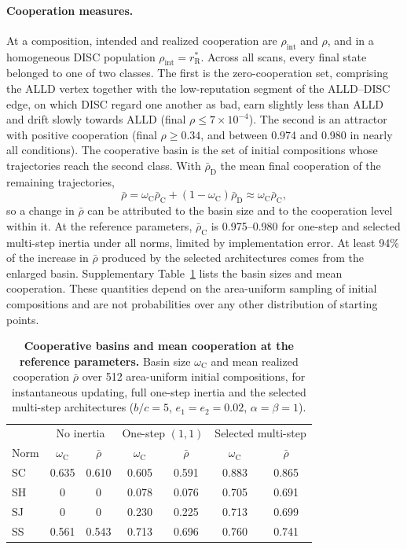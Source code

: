 \documentclass[fleqn,10pt]{wlscirep}
\newcommand{\rR}{r_{\mathrm{R}}^{*}}
\theoremstyle{plain}
\begin{document}
\paragraph{Cooperation measures.} At a composition, intended and realized cooperation are $\rho_{\mathrm{int}}$ and $\rho$, and in a homogeneous DISC population $\rho_{\mathrm{int}}=\rR$. Across all scans, every final state belonged to one of two classes. The first is the zero-cooperation set, comprising the ALLD vertex together with the low-reputation segment of the ALLD--DISC edge, on which DISC regard one another as bad, earn slightly less than ALLD and drift slowly towards ALLD (final $\rho\leq7\times10^{-4}$). The second is an attractor with positive cooperation (final $\rho\geq0.34$, and between 0.974 and 0.980 in nearly all conditions). The cooperative basin is the set of initial compositions whose trajectories reach the second class. With $\bar\rho_{\mathrm D}$ the mean final cooperation of the remaining trajectories,
\begin{equation}
\bar\rho=\omega_{\mathrm C}\bar\rho_{\mathrm C}+(1-\omega_{\mathrm C})\bar\rho_{\mathrm D}\approx\omega_{\mathrm C}\bar\rho_{\mathrm C},
\label{eq:s-decomposition}
\end{equation}
so a change in $\bar\rho$ can be attributed to the basin size and to the cooperation level within it. At the reference parameters, $\bar\rho_{\mathrm C}$ is 0.975--0.980 for one-step and selected multi-step inertia under all norms, limited by implementation error. At least 94\% of the increase in $\bar\rho$ produced by the selected architectures comes from the enlarged basin. Supplementary Table~\ref{tab:si-basins} lists the basin sizes and mean cooperation. These quantities depend on the area-uniform sampling of initial compositions and are not probabilities over any other distribution of starting points.

\begin{table}[!htbp]
\centering
\caption{\textbf{Cooperative basins and mean cooperation at the reference parameters.} Basin size $\omega_{\mathrm C}$ and mean realized cooperation $\bar\rho$ over 512 area-uniform initial compositions, for instantaneous updating, full one-step inertia and the selected multi-step architectures ($b/c=5$, $e_1=e_2=0.02$, $\alpha=\beta=1$).}
\label{tab:si-basins}
\small
\begin{tabular}{@{}lcccccc@{}}
\toprule
 & \multicolumn{2}{c}{No inertia} & \multicolumn{2}{c}{One-step $(1,1)$} & \multicolumn{2}{c}{Selected multi-step}\\
Norm & $\omega_{\mathrm C}$ & $\bar\rho$ & $\omega_{\mathrm C}$ & $\bar\rho$ & $\omega_{\mathrm C}$ & $\bar\rho$\\
\midrule
SC & 0.635 & 0.610 & 0.605 & 0.591 & 0.883 & 0.865\\
SH & 0 & 0 & 0.078 & 0.076 & 0.705 & 0.691\\
SJ & 0 & 0 & 0.230 & 0.225 & 0.713 & 0.699\\
SS & 0.561 & 0.543 & 0.713 & 0.696 & 0.760 & 0.741\\
\bottomrule
\end{tabular}
\end{table}
\end{document}
